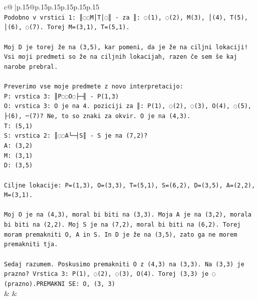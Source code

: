 \documentclass{article}
\begin{document}
{\begin{supertabular}{c@{$\;$}|p{.15\linewidth}@{}p{.15\linewidth}p{.15\linewidth}p{.15\linewidth}p{.15\linewidth}p{.15\linewidth}}
{{{\\ 
\texttt{Podobno v vrstici 1: ║◌◌M│T│◌║ {-} za ║: ◌(1), ◌(2), M(3), │(4), T(5), │(6), ◌(7). Torej M=(3,1), T=(5,1).} \\
\\ 
\texttt{Moj D je torej že na (3,5), kar pomeni, da je že na ciljni lokaciji! Vsi moji predmeti so že na ciljnih lokacijah, razen če sem še kaj narobe prebral.} \\
\\ 
\texttt{Preverimo vse moje predmete z novo interpretacijo:} \\
\texttt{P: vrstica 3: ║P◌◌O◌├─╢ {-} P(1,3)} \\
\texttt{O: vrstica 3: O je na 4. poziciji za ║: P(1), ◌(2), ◌(3), O(4), ◌(5), ├(6), ─(7)? Ne, to so znaki za okvir. O je na (4,3).} \\
\texttt{T: (5,1)} \\
\texttt{S: vrstica 2: ║◌◌A└─┤S║ {-} S je na (7,2)? } \\
\texttt{A: (3,2)} \\
\texttt{M: (3,1)} \\
\texttt{D: (3,5)} \\
\\ 
\texttt{Ciljne lokacije: P=(1,3), O=(3,3), T=(5,1), S=(6,2), D=(3,5), A=(2,2), M=(3,1).} \\
\\ 
\texttt{Moj O je na (4,3), moral bi biti na (3,3). Moja A je na (3,2), morala bi biti na (2,2). Moj S je na (7,2), moral bi biti na (6,2). Torej moram premakniti O, A in S. In D je že na (3,5), zato ga ne morem premakniti tja.} \\
\\ 
\texttt{Sedaj razumem. Poskusimo premakniti O z (4,3) na (3,3). Na (3,3) je prazno? Vrstica 3: P(1), ◌(2), ◌(3), O(4). Torej (3,3) je ◌ (prazno).PREMAKNI SE: O, (3, 3)} \\
            }
        }
    }
    & & \\ \\


\end{supertabular}}
\end{document}
